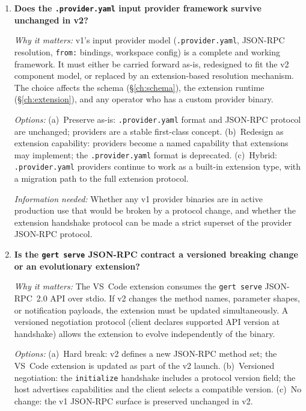 \begin{enumerate}[label=\textbf{Q\arabic*.}]
    \textit{Information needed:} A threat model analysis of what happens when a malicious or
    compromised extension contributes a policy that attempts to weaken host restrictions. This should
    feed into \S\ref{ch:security}.

  \item \textbf{Does the \texttt{.provider.yaml} input provider framework survive unchanged in v2?}

    \textit{Why it matters:} v1's input provider model (\texttt{.provider.yaml}, JSON-RPC resolution,
    \texttt{from:} bindings, workspace config) is a complete and working framework. It must either be
    carried forward as-is, redesigned to fit the v2 component model, or replaced by an extension-based
    resolution mechanism. The choice affects the schema (\S\ref{ch:schema}), the extension runtime
    (\S\ref{ch:extension}), and any operator who has a custom provider binary.

    \textit{Options:} (a)~Preserve as-is: \texttt{.provider.yaml} format and JSON-RPC protocol are
    unchanged; providers are a stable first-class concept. (b)~Redesign as extension capability:
    providers become a named capability that extensions may implement; the \texttt{.provider.yaml}
    format is deprecated. (c)~Hybrid: \texttt{.provider.yaml} providers continue to work as a
    built-in extension type, with a migration path to the full extension protocol.

    \textit{Information needed:} Whether any v1 provider binaries are in active production use that
    would be broken by a protocol change, and whether the extension handshake protocol can be made a
    strict superset of the provider JSON-RPC protocol.

  \item \textbf{Is the \texttt{gert serve} JSON-RPC contract a versioned breaking change or an
    evolutionary extension?}

    \textit{Why it matters:} The VS~Code extension consumes the \texttt{gert serve} JSON-RPC~2.0 API
    over stdio. If v2 changes the method names, parameter shapes, or notification payloads, the
    extension must be updated simultaneously. A versioned negotiation protocol (client declares
    supported API version at handshake) allows the extension to evolve independently of the binary.

    \textit{Options:} (a)~Hard break: v2 defines a new JSON-RPC method set; the VS~Code extension is
    updated as part of the v2 launch. (b)~Versioned negotiation: the \texttt{initialize} handshake
    includes a protocol version field; the host advertises capabilities and the client selects a
    compatible version. (c)~No change: the v1 JSON-RPC surface is preserved unchanged in v2.


\end{enumerate}

